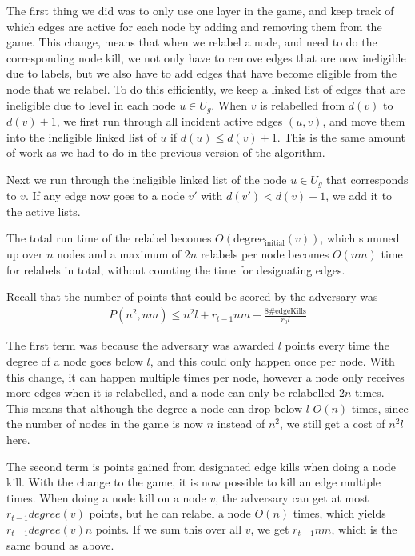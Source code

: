The first thing we did was to only use one layer in the game, and keep track of which edges are active for each node by adding and removing them from the game.
This change, means that when we relabel a node, and need to do the corresponding node kill, 
we not only have to remove edges that are now ineligible due to labels, but we also have to add edges that have become eligible from the node that we relabel.
To do this efficiently, we keep a linked list of edges that are ineligible due to level in each node $u \in U_g$. 
When $v$ is relabelled from $d(v)$ to $d(v)+1$, we first run through all incident active edges $(u, v)$, and move them into the ineligible linked list of $u$ if $d(u) \leq d(v)+1$.
This is the same amount of work as we had to do in the previous version of the algorithm.

Next we run through the ineligible linked list of the node $u \in U_g$ that corresponds to $v$. If any edge now goes to a node $v'$ with $d(v')<d(v)+1$, we add it to the active lists.

The total run time of the relabel becomes $O(\mathrm{degree_{initial}}(v))$, which summed up over $n$ nodes and a maximum of $2n$ relabels per node becomes $O(nm)$ time for relabels in total,
without counting the time for designating edges. 

Recall that the number of points that could be scored by the adversary was
\begin{align*}
P(n^2, nm) \leq n^2l + r_{t-1}nm + \frac{8\mathrm{\#edgeKills}}{r_0l}
\end{align*}

The first term was because the adversary was awarded $l$ points every time the degree of a node goes below $l$, and this could only happen once per node.
With this change, it can happen multiple times per node, however a node only receives more edges when it is relabelled, and a node can only be relabelled $2n$ times.
This means that although the degree a node can drop below $l$ $O(n)$ times, since the number of nodes in the game is now $n$ instead of $n^2$, we still get a cost of $n^2l$ here.

The second term is points gained from designated edge kills when doing a node kill. With the change to the game, it is now possible to kill an edge multiple times.
When doing a node kill on a node $v$, the adversary can get at most $r_{t-1}degree(v)$ points, but he can relabel a node $O(n)$ times, which yields $r_{t-1}degree(v)n$ points.
If we sum this over all $v$, we get $r_{t-1}nm$, which is the same bound as above.

